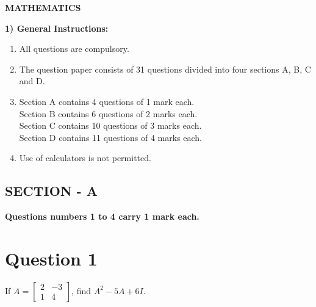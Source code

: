 \documentclass[a4paper,12pt]{article}
\begin{document}
\thispagestyle{fancy}
\fancyhf{} %
\fancyfoot[C]{\thepage}
\vspace*{0.1em}
\begin{center}
    \textbf{\huge MATHEMATICS}
\end{center}
\noindent{}

\vspace{1em}

\textbf{1) General Instructions:}
\begin{enumerate}
    \item All questions are compulsory.
    \item The question paper consists of 31 questions divided into four sections A, B, C and D.
    \item Section A contains 4 questions of 1 mark each.\\
          Section B contains 6 questions of 2 marks each.\\
          Section C contains 10 questions of 3 marks each.\\
          Section D contains 11 questions of 4 marks each.
    \item Use of calculators is not permitted.
\end{enumerate}

\vspace{1em}

\begin{center}
    \section*{\large \textbf{SECTION - A}} 
    \textbf{Questions numbers 1 to 4 carry 1 mark each.}
\end{center}

\vspace{1em}

\section*{Question 1}
If $A = \begin{bmatrix} 2 & -3 \\ 1 & 4 \end{bmatrix}$, find $A^2 - 5A + 6I$.
\end{document}
